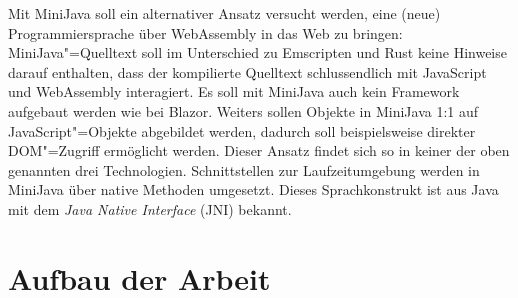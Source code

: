 Mit MiniJava soll ein alternativer Ansatz versucht werden, eine (neue) Programmiersprache über WebAssembly in das Web zu bringen: MiniJava"=Quelltext soll im Unterschied zu Emscripten und Rust keine Hinweise darauf enthalten, dass der kompilierte Quelltext schlussendlich mit JavaScript und WebAssembly interagiert. Es soll mit MiniJava auch kein Framework aufgebaut werden wie bei Blazor. Weiters sollen Objekte in MiniJava 1:1 auf JavaScript"=Objekte abgebildet werden, dadurch soll beispielsweise direkter DOM"=Zugriff ermöglicht werden. Dieser Ansatz findet sich so in keiner der oben genannten drei Technologien. Schnittstellen zur Laufzeitumgebung werden in MiniJava über native Methoden umgesetzt. Dieses Sprachkonstrukt ist aus Java mit dem \emph{Java Native Interface} (JNI) bekannt.

\section{Aufbau der Arbeit}

